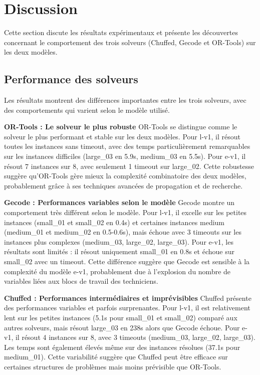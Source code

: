 \section{Discussion}
\label{sec:discussion}

Cette section discute les résultats expérimentaux et présente les découvertes concernant le comportement des trois solveurs (Chuffed, Gecode et OR-Tools) sur les deux modèles.

\subsection{Performance des solveurs}

Les résultats montrent des différences importantes entre les trois solveurs, avec des comportements qui varient selon le modèle utilisé.

\textbf{OR-Tools : Le solveur le plus robuste} OR-Tools se distingue comme le solveur le plus performant et stable sur les deux modèles. Pour l-v1, il résout toutes les instances sans timeout, avec des temps particulièrement remarquables sur les instances difficiles (large\_03 en 5.9s, medium\_03 en 5.5s). Pour e-v1, il résout 7 instances sur 8, avec seulement 1 timeout sur large\_02. Cette robustesse suggère qu'OR-Tools gère mieux la complexité combinatoire des deux modèles, probablement grâce à ses techniques avancées de propagation et de recherche.

\textbf{Gecode : Performances variables selon le modèle} Gecode montre un comportement très différent selon le modèle. Pour l-v1, il excelle sur les petites instances (small\_01 et small\_02 en 0.4s) et certaines instances medium (medium\_01 et medium\_02 en 0.5-0.6s), mais échoue avec 3 timeouts sur les instances plus complexes (medium\_03, large\_02, large\_03). Pour e-v1, les résultats sont limités : il résout uniquement small\_01 en 0.8s et échoue sur small\_02 avec un timeout. Cette différence suggère que Gecode est sensible à la complexité du modèle e-v1, probablement due à l'explosion du nombre de variables liées aux blocs de travail des techniciens.

\textbf{Chuffed : Performances intermédiaires et imprévisibles} Chuffed présente des performances variables et parfois surprenantes. Pour l-v1, il est relativement lent sur les petites instances (5.1s pour small\_01 et small\_02) comparé aux autres solveurs, mais résout large\_03 en 238s alors que Gecode échoue. Pour e-v1, il résout 4 instances sur 8, avec 3 timeouts (medium\_03, large\_02, large\_03). Les temps sont également élevés même sur des instances résolues (37.1s pour medium\_01). Cette variabilité suggère que Chuffed peut être efficace sur certaines structures de problèmes mais moins prévisible que OR-Tools.

